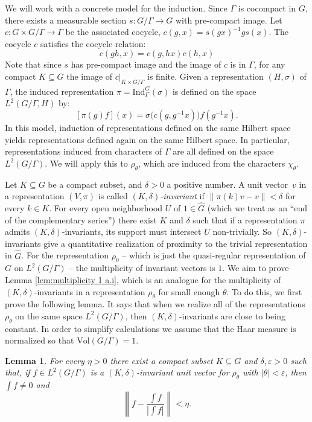 \documentclass[12pt,reqno]{amsart}
\newtheorem{lemma}[theorem]{Lemma}
\theoremstyle{definition}
\newcommand{\abs}[1]{\left| #1 \right|}
\begin{document}
We will work with a concrete model for the induction. Since $\Gamma$ is cocompact in $G$, there exists a measurable section $s\colon G/\Gamma \to G$ with pre-compact image. Let $c\colon G\times G/\Gamma \to \Gamma$ be the associated cocycle, $c(g,x) = s(gx)^{-1}gs(x)$. The cocycle $c$ satisfies the cocycle relation:
$$c(gh,x) = c(g,hx)c(h,x)$$
Note that since $s$ has pre-compact image and the image of $c$ is in $\Gamma$, for any compact $K \subseteq G$ the image of $c|_{K\times G/\Gamma}$ is finite. Given a representation $(H,\sigma)$ of $\Gamma$, the induced representation $\pi=\mathrm{Ind}_\Gamma^G(\sigma)$ is defined on the space $L^2(G/\Gamma,H)$ by:
\begin{equation}\label{eq:cocycle-rep-equation}
    [\pi(g)f](x) = \sigma\bigl(c(g,g^{-1}x)\bigr)f(g^{-1}x).
\end{equation}
In this model, induction of representations defined on the same Hilbert space yields representations defined again on the same Hilbert space. In particular, representations induced from characters of $\Gamma$ are all defined on the space $L^2(G / \Gamma)$. We will apply this to $\rho_\theta$, which are induced from the characters $\chi_\theta$.

Let $K \subseteq G$ be a compact subset, and $\delta > 0$ a positive number. A unit vector~$v$ in a representation $(V, \pi)$ is called \emph{$(K, \delta)$-invariant} if $\|\pi(k)v - v\| < \delta$ for every $k \in K$.
For every open neighborhood $U$ of $1 \in \widehat{G}$ (which we treat as an ``end of the complementary series'') there exist $K$ and $\delta$ such that if a representation $\pi$ admits $(K,\delta)$-invariants, its support must intersect $U$ non-trivially.
So $(K,\delta)$-invariants give a quantitative realization of proximity to the trivial representation in $\widehat{G}$.  For the representation $\rho_0$ -- which is just the quasi-regular representation of $G$ on $L^2(G/\Gamma)$ -- the multiplicity of invariant vectors is $1$. We aim to prove Lemma \ref{lem:multiplicity 1 a.i}, which is an analogue for the multiplicity of $(K,\delta)$-invariants in a representation $\rho_\theta$ for small enough $\theta$. To do this, we first prove the following lemma. It says that when we realize all of the representations $\rho_\theta$ on the same space $L^2(G/\Gamma)$, then $(K,\delta)$-invariants are close to being constant. In order to simplify calculations we assume that the Haar measure is normalized so that $\mathrm{Vol}(G/\Gamma) = 1$.

\begin{lemma}\label{lem:a.i close to invariants}
    For every $\eta > 0$ there exist a compact subset $K \subseteq G$ and $\delta,\varepsilon > 0$ such that, if $f \in L^2(G/\Gamma)$ is a $(K,\delta)$-invariant unit vector for $\rho_\theta$ with $\abs{\theta} < \varepsilon$, then $\int f\ne 0$ and
    \[
        \left\|f-\frac{\int f}{|\int f|}\right\| < \eta.
    \]
\end{lemma}
\end{document}
